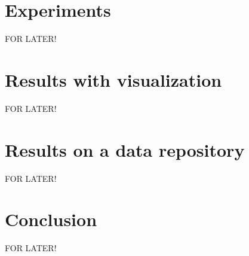 \documentclass[11pt]{article}
\begin{document}



\section{Experiments}
FOR LATER!

\section{Results with visualization}
FOR LATER!

\section{Results on a data repository}
FOR LATER!

\section{Conclusion}
FOR LATER!
\end{document}
